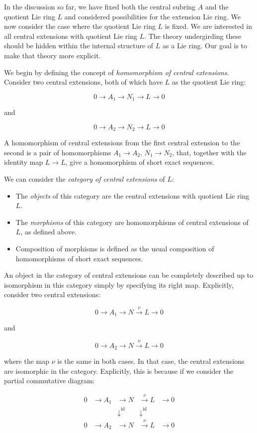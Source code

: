 In the discussion so far, we have fixed both the central subring $A$
and the quotient Lie ring $L$ and considered possibilities for the
extension Lie ring. We now consider the case where the quotient Lie
ring $L$ is fixed. We are interested in all central extensions with
quotient Lie ring $L$. The theory undergirding these should be hidden
within the internal structure of $L$ as a Lie ring. Our goal is to
make that theory more explicit.

We begin by defining the concept of {\em homomorphism of central
  extensions}. Consider two central extensions, both of which have $L$
as the quotient Lie ring:

$$0 \to A_1 \to N_1 \to L \to 0$$

and

$$0 \to A_2 \to N_2 \to L \to 0$$

A homomorphism of central extensions from the first central extension
to the second is a pair of homomorphisms $A_1 \to A_2$, $N_1 \to N_2$,
that, together with the identity map $L \to L$, give a homomorphism of
short exact sequences.

We can consider the {\em category of central extensions} of $L$:

\begin{itemize}
\item The {\em objects} of this category are the central extensions
  with quotient Lie ring $L$.
\item The {\em morphisms} of this category are homomorphisms of
  central extensions of $L$, as defined above.
\item Composition of morphisms is defined as the usual composition of
  homomorphisms of short exact sequences.
\end{itemize}

An object in the category of central extensions can be completely
described up to isomorphism in this category simply by specifying its
right map. Explicitly, consider two central extensions:

$$0 \to A_1 \to N \stackrel{\nu}{\to} L \to 0$$

and

$$0 \to A_2 \to N \stackrel{\nu}{\to} L \to 0$$

where the map $\nu$ is the same in both cases. In that case, the
central extensions are isomorphic in the category. Explicitly, this is
because if we consider the partial commutative diagram:

$$\begin{array}{rrrrr}
  0 & \to A_1 & \to N & \stackrel{\nu}{\to} L & \to 0 \\
  &  & \downarrow^{\text{id}} & \downarrow^{\text{id}} &\\
  0 & \to A_2 & \to N & \stackrel{\nu}{\to} L & \to 0 \\
\end{array}$$

